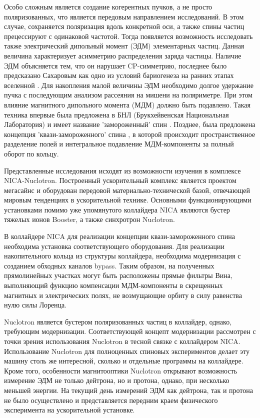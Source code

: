 \par Особо сложным является создание когерентных пучков, а не просто поляризованных, что является передовым направлением исследований. В этом случае, сохраняется поляризация вдоль конкретной оси, а также спины частиц прецессируют с одинаковой частотой. Тогда появляется возможность исследовать также электрический дипольный момент (ЭДМ) элементарных частиц. Данная величина характеризует асимметрию распределения заряда частицы. Наличие ЭДМ объясняется тем, что он нарушает CP-симметрию, последнее было предсказано Сахаровым как одно из условий бариогенеза на ранних этапах вселенной \cite{sakharov}. Для накопления малой величины ЭДМ необходимо долгое удержание пучка с последующим анализом рассеяния на мишени на поляриметре. При этом влияние магнитного дипольного момента (МДМ) должно быть подавлено. Такая техника впервые была предложена в БНЛ (Брукхейвенская Национальная Лаборатория) и имеет название 'замороженный' спин \cite{Farley:edm}. Позднее, была предложена концепция 'квази-замороженного' спина \cite{QFS}, в которой происходит пространственное разделение полей и интегральное подавление МДМ-компоненты за полный оборот по кольцу.

\par Представленные исследования исходят из возможности изучения в комплексе NICA-Nuclotron. Построенный ускорительный комплекс является проектом мегасайнс и оборудован передовой материально-технической базой, отвечающей мировым тенденциях в ускорительной технике. Основными функционирующими установками помимо уже упомянутого коллайдера NICA являются бустер тяжелых ионов Booster, а также синхротрон Nuclotron.

\par В коллайдере NICA для реализации концепции квази-замороженного спина необходима установка соответствующего оборудования. Для реализации накопительного кольца из структуры коллайдера, необходима модернизация с созданием обходных каналов bypass. Таким образом, на полученных прямолинейных участках могут быть расположены прямые фильтры Вина, выполняющий функцию компенсации МДМ-компоненты в скрещенных магнитных и электрических полях, не возмущающие орбиту в силу равенства нулю силы Лоренца.

\par Nuclotron является бустером поляризованных частиц в коллайдер, однако, требующим модернизации. Соответствующей концепт модернизации рассмотрен с точки зрения использования Nuclotron в тесной связке с коллайдером NICA.
Использование Nuclotron для полноценных спиновых экспериментов делает эту машину столь же интересной, сколько и отдельные программы на коллайдере. Кроме того, особенности магнитооптики Nuclotron открывают возможность измерение ЭДМ не только дейтрона, но и протона, однако, при несколько меньшей энергии. На текущий день измерений ЭДМ как дейтрона, так и протона не было осуществлено и представляется передним краем физического эксперимента на ускорительной установке.


